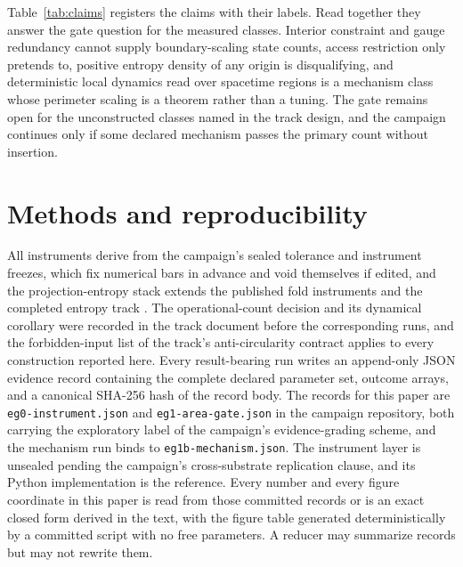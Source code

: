 \documentclass[aps,pre,reprint,nofootinbib]{revtex4-2}
\begin{document}
Table~\ref{tab:claims} registers the claims with their labels.  Read
together they answer the gate question for the measured classes.
Interior constraint and gauge redundancy cannot supply boundary-scaling
state counts, access restriction only pretends to, positive entropy
density of any origin is disqualifying, and deterministic local dynamics
read over spacetime regions is a mechanism class whose perimeter scaling
is a theorem rather than a tuning.  The gate remains open for the
unconstructed classes named in the track design, and the campaign
continues only if some declared mechanism passes the primary count
without insertion.

\section{Methods and reproducibility}
\label{sec:methods}

All instruments derive from the campaign's sealed tolerance and
instrument freezes, which fix numerical bars in advance and void
themselves if edited, and the projection-entropy stack extends the
published fold instruments \cite{EntropyPaper} and the completed entropy
track \cite{SourcesPaper}.  The operational-count decision and its
dynamical corollary were recorded in the track document before the
corresponding runs, and the forbidden-input list of the track's
anti-circularity contract applies to every construction reported here.
Every result-bearing run writes an append-only JSON evidence record
containing the complete declared parameter set, outcome arrays, and a
canonical SHA-256 hash of the record body.  The records for this paper
are \texttt{eg0-instrument.json} and \texttt{eg1-area-gate.json} in the
campaign repository, both carrying the exploratory label of the
campaign's evidence-grading scheme, and the mechanism run binds to
\texttt{eg1b-mechanism.json}.  The instrument layer is unsealed pending
the campaign's cross-substrate replication clause, and its Python
implementation is the reference.  Every number and every figure
coordinate in this paper is read from those committed records or is an
exact closed form derived in the text, with the figure table generated
deterministically by a committed script with no free parameters.  A
reducer may summarize records but may not rewrite them.
\end{document}
